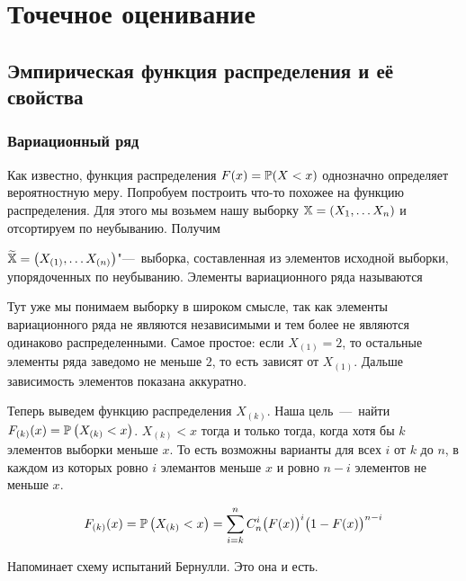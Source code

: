 \documentclass[../TV&MS.tex]{subfiles}
\begin{document}
   
\section{Точечное оценивание}

\subsection{Эмпирическая функция распределения и её свойства}

\subsubsection{Вариационный ряд}

Как известно, функция распределения $F(x) = \mathbb{P}(X < x)$ однозначно определяет вероятностную меру.
Попробуем построить что-то похожее на функцию распределения.
Для этого мы возьмем нашу выборку $\mathbb{X} = \left( X_1,\ldots X_n \right)$ и отсортируем по неубыванию.
Получим

\begin{Def}
     $\widetilde{\mathbb{X}} = \left( X_{(1)},\ldots X_{(n)} \right)$"---~выборка, составленная из элементов исходной выборки, упорядоченных по неубыванию.
    Элементы вариационного ряда называются 
\end{Def}

\begin{Note}
    Тут уже мы понимаем выборку в широком смысле, так как элементы вариационного ряда не являются независимыми и тем более не являются одинаково распределенными.
    Самое простое: если $X_{(1)} = 2$, то остальные элементы ряда заведомо не меньше $2$, то есть зависят от $X_{(1)}$. Дальше зависимость элементов показана аккуратно.
\end{Note} 

Теперь выведем функцию распределения $X_{(k)}$.
Наша цель~---~найти $F_{(k)}(x) = \mathbb{P}\left(X_{(k)} < x\right)$.
$X_{(k)} < x$ тогда и только тогда, когда хотя бы $k$ элементов выборки меньше $x$.
То есть возможны варианты для всех $i$ от $k$ до $n$, в каждом из которых ровно $i$ элемантов меньше $x$ и ровно $n-i$ элементов не меньше $x$.

\begin{equation}
    F_{(k)}(x) = \mathbb{P}\left( X_{(k)} < x \right) = 
    \sum\limits_{i=k}^{n} C_n^{i} \bigl( F(x) \bigr)^i \bigl( 1 - F(x) \bigr)^{n-i}
\end{equation} 

Напоминает схему испытаний Бернулли. Это она и есть.
\end{document}
